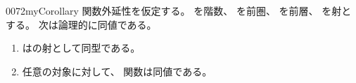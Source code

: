 \documentclass[index]{subfiles}
\begin{document}
\begin{myBlock}{0072}{myCorollary}
  関数外延性を仮定する。
  を階数、
  を前圏、
  を前層、
  を射とする。
  次は論理的に同値である。
  \begin{enumerate}
  \item {}はの射として同型である。
  \item 任意の対象に対して、
    関数は同値である。\myQed
  \end{enumerate}
\end{myBlock}
\end{document}
